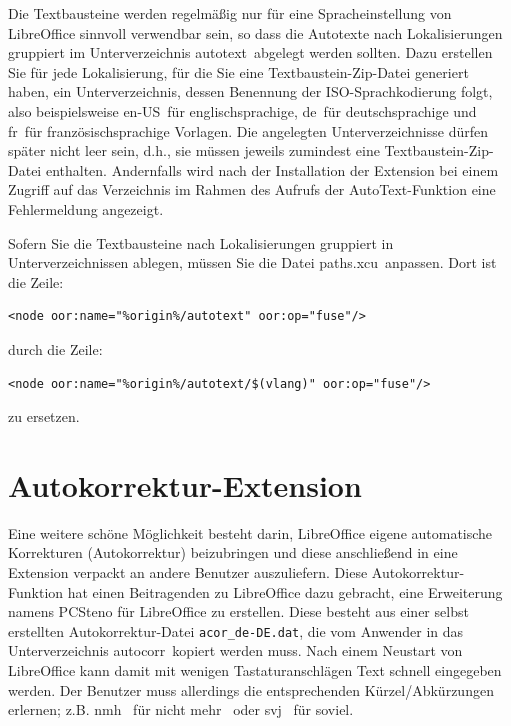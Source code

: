 \documentclass[a4paper,10pt,pagesize,titlepage]{scrbook}
\begin{document}
Die Textbausteine werden regelmäßig nur für eine Spracheinstellung von LibreOffice sinnvoll verwendbar sein, so dass die Autotexte nach Lokalisierungen gruppiert im Unterverzeichnis \glqq autotext\grqq~abgelegt werden sollten. Dazu erstellen Sie für jede Lokalisierung, für die Sie eine Textbaustein-Zip-Datei generiert haben, ein Unterverzeichnis, dessen Benennung der ISO-Sprachkodierung folgt, also  beispielsweise \glqq en-US\grqq~für englischsprachige, \glqq de\grqq~für deutschsprachige und \glqq fr\grqq~für französischsprachige Vorlagen. Die angelegten Unterverzeichnisse dürfen später nicht leer sein, d.h., sie müssen jeweils zumindest eine Textbaustein-Zip-Datei enthalten. Andernfalls wird nach der Installation der Extension bei einem Zugriff auf das Verzeichnis im Rahmen des Aufrufs der AutoText-Funktion eine Fehlermeldung angezeigt.

Sofern Sie die Textbausteine nach Lokalisierungen gruppiert in Unterverzeichnissen ablegen, müssen Sie die Datei \glqq paths.xcu\grqq~anpassen. Dort ist die Zeile:
\begin{lstlisting}
<node oor:name="%origin%/autotext" oor:op="fuse"/>
\end{lstlisting}

durch die Zeile:
\begin{lstlisting}
<node oor:name="%origin%/autotext/$(vlang)" oor:op="fuse"/>
\end{lstlisting}

zu ersetzen.

\section{Autokorrektur-Extension}

Eine weitere schöne Möglichkeit besteht darin, LibreOffice eigene automatische Korrekturen (Autokorrektur) beizubringen und diese anschließend in eine Extension verpackt an andere Benutzer auszuliefern. Diese Autokorrektur-Funktion hat einen Beitragenden zu LibreOffice dazu gebracht, eine Erweiterung namens PCSteno für LibreOffice zu erstellen. Diese besteht aus einer selbst erstellten Autokorrektur-Datei \verb|acor_de-DE.dat|, die vom Anwender in das Unterverzeichnis \glqq autocorr\grqq~kopiert werden muss. Nach einem Neustart von LibreOffice kann damit mit wenigen Tastaturanschlägen Text schnell eingegeben werden. Der Benutzer muss allerdings die entsprechenden Kürzel/Abkürzungen erlernen; z.B. \glqq nmh\grqq~ für \glqq nicht mehr\grqq~ oder \glqq svj\grqq~ für \glqq soviel\grqq.
\end{document}
